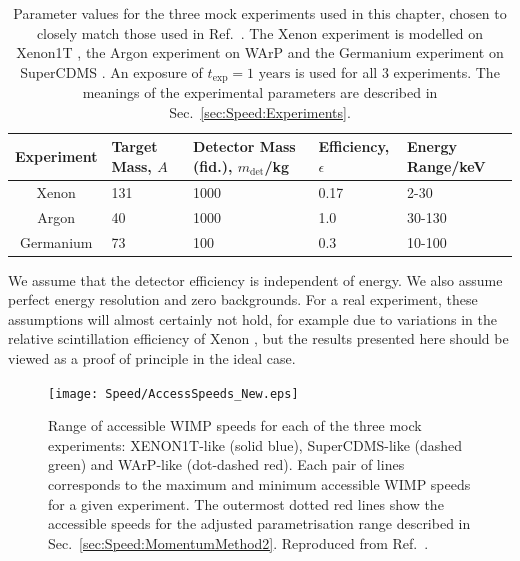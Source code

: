 \begin{table}[t]
  \setlength{\extrarowheight}{2pt}
  \begin{center}
    \begin{tabular}{c|m{1.2cm}m{2.2cm}m{2cm}m{2.1cm}}
    \hline\hline
    Experiment  & Target Mass, $A$ & Detector Mass (fid.), $m_\textrm{det}$/kg & Efficiency, $\epsilon$ & Energy Range/keV\\
	\hline
	Xenon  & 131  & 1000 & 0.17  & 2-30 \\
	Argon  & 40  & 1000 & 1.0 & 30-130  \\
        Germanium  & 73  & 100 & 0.3  & 10-100 \\
        \hline\hline
    \end{tabular}
  \end{center}
  \caption[Parameter values for the three mock experiments used in Chapter \ref{ch:Speed}]{Parameter values for the three mock experiments used in this chapter, chosen to closely match those used in Ref.\ \cite{Peter:2011}. The Xenon experiment is modelled on Xenon1T \cite{Aprile:2009a}, the Argon experiment on WArP \cite{Szelc:2009} and the Germanium experiment on SuperCDMS \cite{Bruch:2010}. An exposure of $t_\textrm{exp} = 1 \textrm{ years}$ is used for all 3 experiments. The meanings of the experimental parameters are described in Sec.\ \ref{sec:Speed:Experiments}.}
\label{tab:Speed:Expts}
\end{table}

We assume that the detector efficiency is independent of energy. We also assume perfect energy resolution and zero backgrounds. For a real experiment, these assumptions will almost certainly not hold, for example due to variations in the relative scintillation efficiency of Xenon \cite{Aprile:2009b}, but the results presented here should be viewed as a proof of principle in the ideal case.

\begin{figure}[t]
  \centering
  \texttt{[image: Speed/AccessSpeeds\_New.eps]}
\caption[Range of accessible WIMP speeds for mock direct detection experiments]{Range of accessible WIMP speeds for each of the three mock experiments: XENON1T-like (solid blue), SuperCDMS-like (dashed green) and WArP-like (dot-dashed red). Each pair of lines corresponds to the maximum and minimum accessible WIMP speeds for a given experiment. The outermost dotted red lines show the accessible speeds for the adjusted parametrisation range described in Sec.~\ref{sec:Speed:MomentumMethod2}. Reproduced from Ref.~\cite{Kavanagh:2012}.}
  \label{fig:Speed:Access}
\end{figure}

